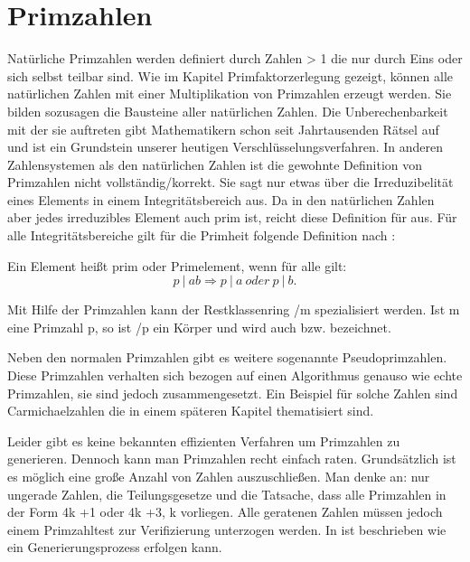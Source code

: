 	\section*{Primzahlen}\label{Kapitel Primzahlen}
		Natürliche Primzahlen werden definiert durch Zahlen > 1 die nur durch Eins oder sich selbst teilbar sind. Wie im Kapitel Primfaktorzerlegung gezeigt, können alle natürlichen Zahlen mit einer Multiplikation von Primzahlen erzeugt werden. Sie bilden sozusagen die Bausteine aller natürlichen Zahlen. Die Unberechenbarkeit mit der sie auftreten gibt Mathematikern schon seit Jahrtausenden Rätsel auf und ist ein Grundstein unserer heutigen Verschlüsselungsverfahren.
		In anderen Zahlensystemen als den natürlichen Zahlen ist die gewohnte Definition von Primzahlen nicht vollständig/korrekt. Sie sagt nur etwas über die Irreduzibelität eines Elements in einem Integritätsbereich aus. Da in den natürlichen Zahlen aber jedes irreduzibles Element auch prim ist, reicht diese Definition für  aus.
		Für alle Integritätsbereiche gilt für die Primheit folgende Definition nach \cite{Algorithmische:Zahlentheorie}:
			
		Ein Element  heißt prim oder Primelement, wenn für alle  gilt:	
		\begin{displaymath}
			p~|~ab \Longrightarrow p~|~a~oder~p~|~b.
		\end{displaymath}
			
		Mit Hilfe der Primzahlen kann der Restklassenring /m spezialisiert werden. Ist m eine Primzahl p, so ist /p ein Körper und wird auch  bzw.  bezeichnet.
			
		Neben den normalen Primzahlen gibt es weitere sogenannte Pseudoprimzahlen. Diese Primzahlen verhalten sich bezogen auf einen Algorithmus genauso wie echte Primzahlen, sie sind jedoch zusammengesetzt. Ein Beispiel für solche Zahlen sind Carmichaelzahlen die in einem späteren Kapitel thematisiert sind.
			
		Leider gibt es keine bekannten effizienten Verfahren um Primzahlen zu generieren. Dennoch kann man Primzahlen recht einfach raten. Grundsätzlich ist es möglich eine große Anzahl von Zahlen auszuschließen. Man denke an: nur ungerade Zahlen, die Teilungsgesetze und die Tatsache, dass alle Primzahlen  in der Form 4k +1 oder 4k +3, k \myin {} vorliegen. Alle geratenen Zahlen müssen jedoch einem Primzahltest zur Verifizierung unterzogen werden. In \cite{Algebraische:und:zahlentheoretische:Grundlagen:fuer:die:Informatik} ist beschrieben wie ein Generierungsprozess erfolgen kann.

